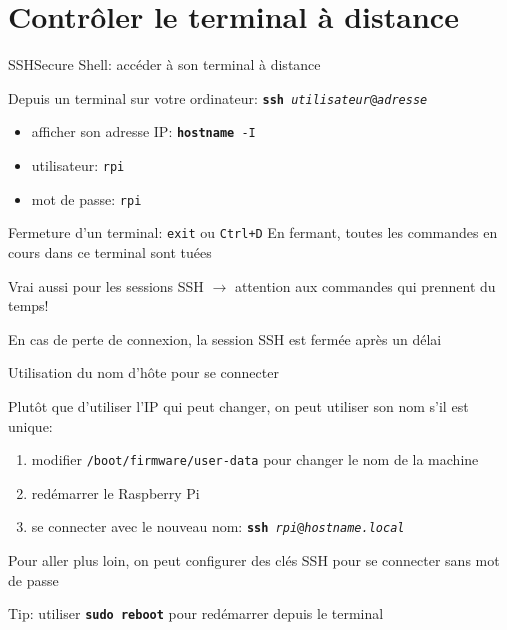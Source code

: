 \documentclass[
aspectratio=169 %
]{beamer}
\newcommand{\cmd}[1]{\texttt{\textbf{#1}}}
\newcommand{\args}[1]{\texttt{\textit{#1}}}
\begin{document}
\section{Contrôler le terminal à distance} \frame{\sectionpage}

\begin{frame}{SSH}{Secure Shell: accéder à son terminal à distance}

    Depuis un terminal sur votre ordinateur:
    \cmd{ssh}\args{ utilisateur}\texttt{@}\args{adresse}

    \begin{itemize}
        \item afficher son adresse IP: \cmd{hostname}\texttt{ -I}
        \item utilisateur: \texttt{rpi}
        \item mot de passe: \texttt{rpi}
    \end{itemize}

    \bigskip
    \begin{block}{Fermeture d'un terminal: \texttt{exit} ou \texttt{Ctrl+D}}
        En fermant, toutes les commandes en cours dans ce terminal sont tuées

        \bigskip
        Vrai aussi pour les sessions SSH \(\rightarrow\) \alert{attention aux
            commandes qui prennent du temps!}

        \bigskip
        En cas de perte de connexion, la session SSH est fermée après un délai

    \end{block}

\end{frame}

\begin{frame}{Utilisation du nom d'hôte pour se connecter}

    Plutôt que d'utiliser l'IP qui peut changer, on peut utiliser son nom s'il
    est
    unique:
    \begin{enumerate}
        \item modifier \texttt{/boot/firmware/user-data} pour
              changer le nom de la machine
        \item redémarrer le Raspberry Pi
        \item se connecter avec le nouveau nom:
              \cmd{ssh}\args{ rpi}\texttt{@}\args{hostname.local}
    \end{enumerate}

    \bigskip
    Pour aller plus loin, on peut configurer des clés SSH pour se connecter sans
    mot de passe

    \bigskip
    \alert{Tip:} utiliser \cmd{sudo reboot} pour redémarrer depuis le terminal
\end{frame}
\end{document}
